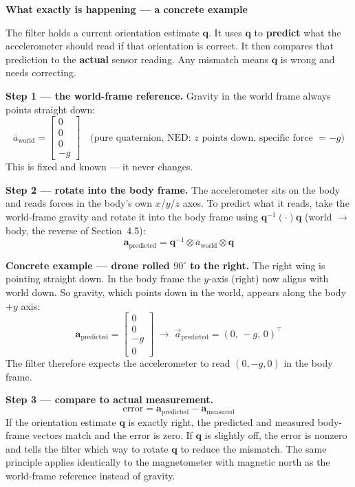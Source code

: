\documentclass[12pt, a4paper]{article}
\begin{document}
\begin{notebox}
  \textbf{What exactly is happening --- a concrete example}

  The filter holds a current orientation estimate $\mathbf{q}$.
  It uses $\mathbf{q}$ to \textbf{predict} what the accelerometer should
  read if that orientation is correct.
  It then compares that prediction to the \textbf{actual} sensor reading.
  Any mismatch means $\mathbf{q}$ is wrong and needs correcting.

  \textbf{Step 1 --- the world-frame reference.}
  Gravity in the world frame always points straight down:
  \[
    \bar{a}_\text{world}
    = \begin{bmatrix}0\\0\\0\\{-g}\end{bmatrix}
    \quad\text{(pure quaternion, NED: $z$ points down, specific force $= -g$)}
  \]
  This is fixed and known --- it never changes.

  \textbf{Step 2 --- rotate into the body frame.}
  The accelerometer sits on the body and reads forces in the body's own
  $x$/$y$/$z$ axes.
  To predict what it reads, take the world-frame gravity and rotate it
  into the body frame using $\mathbf{q}^{-1}(\cdot)\mathbf{q}$
  (world $\to$ body, the reverse of Section~4.5):
  \[
    \mathbf{a}_\text{predicted}
    = \mathbf{q}^{-1} \otimes \bar{a}_\text{world} \otimes \mathbf{q}
  \]

  \textbf{Concrete example --- drone rolled $90^\circ$ to the right.}
  The right wing is pointing straight down.
  In the body frame the $y$-axis (right) now aligns with world down.
  So gravity, which points down in the world, appears along the body
  $+y$ axis:
  \[
    \mathbf{a}_\text{predicted}
    = \begin{bmatrix}0\\0\\{-g}\\0\end{bmatrix}
    \;\to\;
    \vec{a}_\text{predicted} = (0,\,-g,\,0)^\top
  \]
  The filter therefore expects the accelerometer to read $(0, -g, 0)$
  in the body frame.

  \textbf{Step 3 --- compare to actual measurement.}
  \[
    \text{error} = \mathbf{a}_\text{predicted} - \mathbf{a}_\text{measured}
  \]
  If the orientation estimate $\mathbf{q}$ is exactly right, the predicted
  and measured body-frame vectors match and the error is zero.
  If $\mathbf{q}$ is slightly off, the error is nonzero and tells the
  filter which way to rotate $\mathbf{q}$ to reduce the mismatch.
  The same principle applies identically to the magnetometer with
  magnetic north as the world-frame reference instead of gravity.
\end{notebox}
\end{document}

